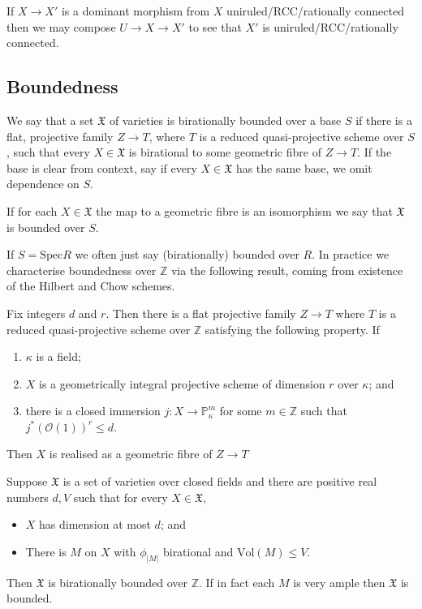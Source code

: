 \documentclass[a4paper,12pt]{book}
\newcommand{\Vol}{\text{Vol}}
\begin{document}
If $X \to X'$ is a dominant morphism from $X$ uniruled/RCC/rationally connected then we may compose $U \to X \to X'$ to see that $X'$ is uniruled/RCC/rationally connected. 


\subsection{Boundedness}

\begin{definition}\label{d_birationally-bounded} We say that a set $\mathfrak{X}$ 
	of varieties is birationally bounded over a base $S$ if there is a flat, projective family $Z \to T$, where $T$ is a reduced quasi-projective scheme over $S$, such that every $X\in \mathfrak{X}$ is birational to some geometric fibre of $Z \to T$. If the base is clear from context, say if every $X \in \mathfrak{X}$ has the same base, we omit dependence on $S$.
	
	If for each $X \in \mathfrak{X}$ the map to a geometric fibre is an isomorphism we say that $\mathfrak{X}$ is bounded over $S$.
\end{definition}

If $S=\text{Spec}{R}$ we often just say (birationally) bounded over $R$. In practice we characterise boundedness over $\mathbb{Z}$ via the following result, coming from existence of the Hilbert and Chow schemes.

\begin{lemma}\cite[Proposition 5.3]{tanaka2019boundedness}
	Fix integers $d$ and $r$. Then there is a flat projective family $Z \to T$ where $T$ is a reduced quasi-projective scheme over $\mathbb{Z}$ satisfying the following property. If
	\begin{enumerate}
		\item $\kappa$ is a field;
		\item $X$ is a geometrically integral projective scheme of dimension $r$ over $\kappa$; and
		\item there is a closed immersion $j\colon X \to \mathbb{P}^{m}_{\kappa}$ for some $m\in \mathbb{Z}$ such that $j^{*}(\mathcal{O}(1))^{r} \leq d$.
	\end{enumerate}
	
	Then $X$ is realised as a geometric fibre of $Z \to T$
\end{lemma}

\begin{corollary}\label{l_birationally-bounded}
	Suppose $\mathfrak{X}$ is a set of varieties over closed fields and there are positive real numbers $d,V$ such that for every $X \in \mathfrak{X}$,
	\begin{itemize}
		\item $X$ has dimension at most $d$; and
		\item There is $M$ on $X$ with $\phi_{|M|}$ birational and $\Vol(M)\leq V$.
	\end{itemize}
	Then $\mathfrak{X}$ is birationally bounded over $\mathbb{Z}$. If in fact each $M$ is very ample then $\mathfrak{X}$ is bounded. 
\end{corollary}
\end{document}
